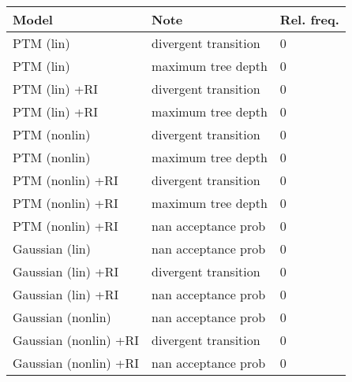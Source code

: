 
\begin{tabu} to 
\toprule
Model & Note & Rel. freq.\\
\midrule
PTM (lin) & divergent transition & 0\\
PTM (lin) & maximum tree depth & 0\\
\addlinespace
PTM (lin) +RI & divergent transition & 0\\
PTM (lin) +RI & maximum tree depth & 0\\
\addlinespace
PTM (nonlin) & divergent transition & 0\\
PTM (nonlin) & maximum tree depth & 0\\
\addlinespace
PTM (nonlin) +RI & divergent transition & 0\\
PTM (nonlin) +RI & maximum tree depth & 0\\
\addlinespace
PTM (nonlin) +RI & nan acceptance prob & 0\\
Gaussian (lin) & nan acceptance prob & 0\\
Gaussian (lin) +RI & divergent transition & 0\\
Gaussian (lin) +RI & nan acceptance prob & 0\\
Gaussian (nonlin) & nan acceptance prob & 0\\
Gaussian (nonlin) +RI & divergent transition & 0\\
Gaussian (nonlin) +RI & nan acceptance prob & 0\\
\bottomrule
\end{tabu}